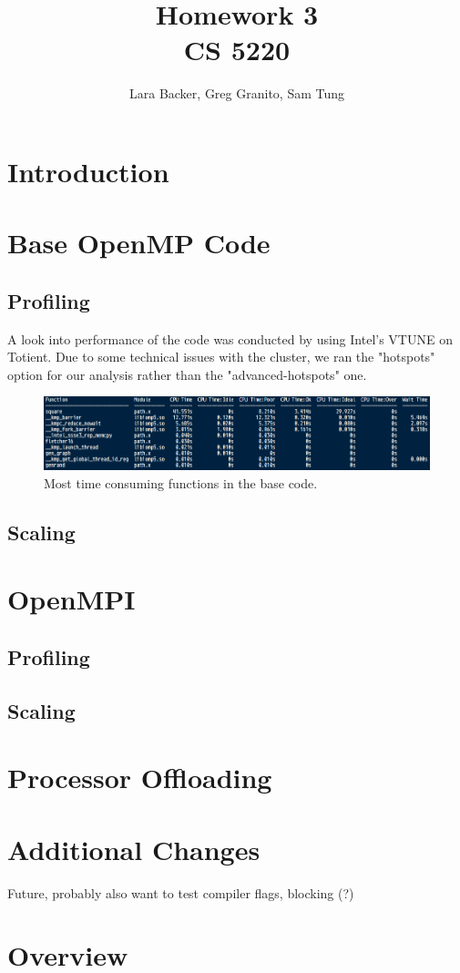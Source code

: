 \documentclass{article}
\begin{document}
\title{Homework 3 \\CS 5220}
\author{Lara Backer, Greg Granito, Sam Tung}

\maketitle

\section{Introduction}

\section{Base OpenMP Code}

\subsection{Profiling}
A look into performance of the code was conducted by using Intel's VTUNE on Totient. Due to some technical issues with the cluster, we ran the "hotspots" option for our analysis rather than the "advanced-hotspots" one. 
	\begin{figure}[h!]
		\begin{center}
			\includegraphics[width=0.7\columnwidth]{amplxe}
			\caption{Most time consuming functions in the base code.}
			\label{amplxe}
		\end{center}
	\end{figure}

\subsection{Scaling}

\section{OpenMPI}

\subsection{Profiling}
\subsection{Scaling}

\section{Processor Offloading}

\section{Additional Changes}
Future, probably also want to test compiler flags, blocking (?)

\section{Overview}

\begin{thebibliography}{1}

\end{thebibliography}
\end{document}
